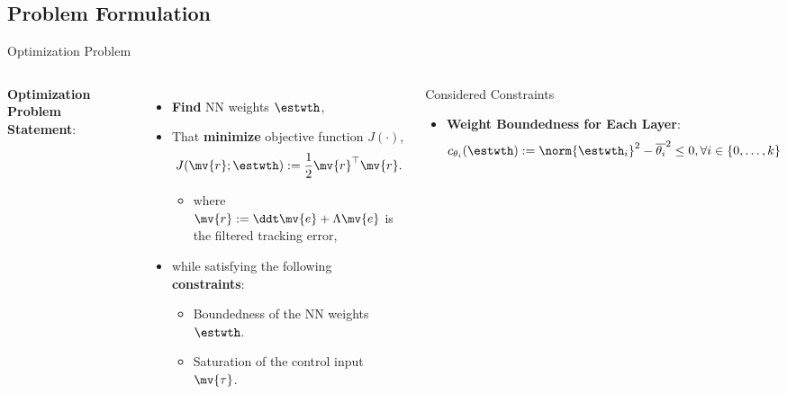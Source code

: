 \documentclass[8pt, aspectratio=169]{beamer}
\begin{document}
\subsection{Problem Formulation}

\begin{frame}{\insertsubsectionhead}{Optimization Problem}

\begin{columns}


    \textbf{Optimization Problem Statement}:

    \begin{itemize}
      \item \textbf{Find} NN weights $\estwth$,
      \item That \textbf{minimize} objective function $J(\cdot)$,
        \begin{equation}\label{eq:obj}
          J(\mv{r};\estwth)
          := 
          \frac{1}{2} \mv{r}^\top \mv{r}.
        \end{equation}
        \begin{itemize}
          \item where $\mv{r} := \ddt\mv{e} + \Lambda\mv{e}$ is the filtered tracking error,
        \end{itemize}
      \item while satisfying the following \textbf{constraints}:
        \begin{itemize}
          \item Boundedness of the NN weights $\estwth$.
          \item Saturation of the control input $\mv{\tau}$.
        \end{itemize}
    \end{itemize}

  

    \begin{block}{Considered Constraints}

      \begin{itemize}
        \item \textbf{Weight Boundedness for Each Layer}: 
          \begin{equation}\label{eq:cstr:weight}
            c_{\theta_i}(\estwth)
            :=
            \norm{\estwth_i}^2 - \overline{\theta_i}^2 \le 0
            , 
            \forall i\in\{0,\ldots,k\}
          \end{equation}


\end{itemize}
\end{block}
\end{columns}
\end{frame}
\end{document}
